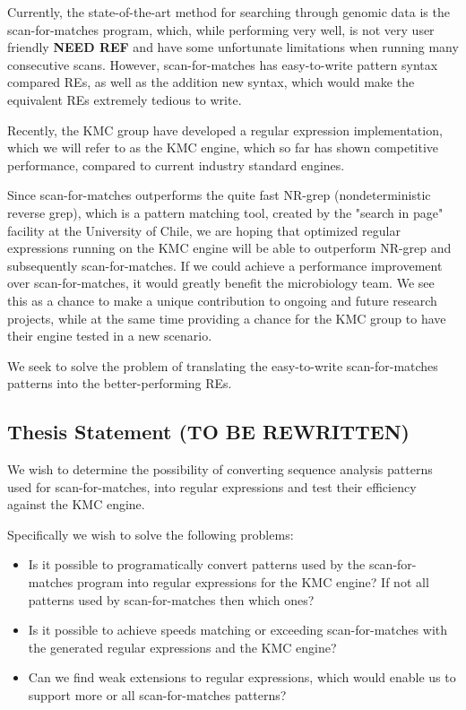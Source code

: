 \documentclass[12pt]{article}
\theoremstyle{definition}
\begin{document}
Currently, the state-of-the-art method for searching through genomic data is the scan-for-matches program, which, while performing very well, is not very user friendly \textbf{NEED REF} and have some unfortunate limitations when running many consecutive scans. However, scan-for-matches has easy-to-write pattern syntax compared REs, as well as the addition new syntax, which would make the equivalent REs extremely tedious to write.

Recently, the KMC group have developed a regular expression implementation, which we will refer to as the KMC engine, which so far has shown competitive performance, compared to current industry standard engines\cite{two-pass-greedy}.

Since scan-for-matches outperforms the quite fast NR-grep (nondeterministic reverse grep), which is a pattern matching tool, created by the "search in page" facility at the University of Chile\cite{nrgrep}, we are hoping that optimized regular expressions running on the KMC engine will be able to outperform NR-grep and subsequently scan-for-matches.
If we could achieve a performance improvement over scan-for-matches, it would greatly benefit the microbiology team. We see this as a chance to make a unique contribution to ongoing and future research projects, while at the same time providing a chance for the KMC group to have their engine tested in a new scenario.

We seek to solve the problem of translating the easy-to-write scan-for-matches patterns into the better-performing REs.


\subsection{Thesis Statement (TO BE REWRITTEN)}

We wish to determine the possibility of converting sequence analysis patterns used for scan-for-matches\cite{scan-for-matches}, into regular expressions\cite{crash-course-regex} and test their efficiency against the KMC\cite{kmc-website} engine.

Specifically we wish to solve the following problems:

\begin{itemize}
	\item Is it possible to programatically convert patterns used by the scan-for-matches program into regular expressions for the KMC engine? If not all patterns used by scan-for-matches then which ones?
	\item Is it possible to achieve speeds matching or exceeding scan-for-matches with the generated regular expressions and the KMC engine?
	\item Can we find weak extensions to regular expressions, which would enable us to support more or all scan-for-matches patterns?
\end{itemize}
\end{document}
